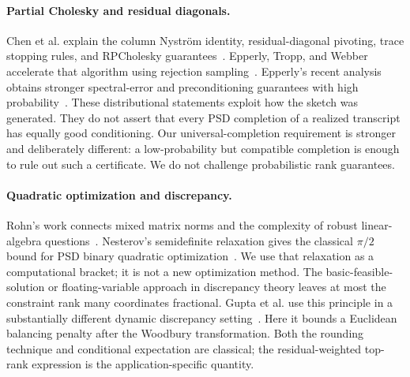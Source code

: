 \documentclass[11pt]{article}
\theoremstyle{definition}\newtheorem{definition}[theorem]{Definition}
\begin{document}
\paragraph{Partial Cholesky and residual diagonals.}
Chen et al. explain the column Nystr\"om identity, residual-diagonal pivoting, trace stopping rules, and RPCholesky guarantees~\cite{chen}. Epperly, Tropp, and Webber accelerate that algorithm using rejection sampling~\cite{accelerated}. Epperly's recent analysis obtains stronger spectral-error and preconditioning guarantees with high probability~\cite{epperly2026}. These distributional statements exploit how the sketch was generated. They do not assert that every PSD completion of a realized transcript has equally good conditioning. Our universal-completion requirement is stronger and deliberately different: a low-probability but compatible completion is enough to rule out such a certificate. We do not challenge probabilistic rank guarantees.

\paragraph{Quadratic optimization and discrepancy.}
Rohn's work connects mixed matrix norms and the complexity of robust linear-algebra questions~\cite{rohn}. Nesterov's semidefinite relaxation gives the classical $\pi/2$ bound for PSD binary quadratic optimization~\cite{nesterov}. We use that relaxation as a computational bracket; it is not a new optimization method. The basic-feasible-solution or floating-variable approach in discrepancy theory leaves at most the constraint rank many coordinates fractional. Gupta et al. use this principle in a substantially different dynamic discrepancy setting~\cite{discrepancy}. Here it bounds a Euclidean balancing penalty after the Woodbury transformation. Both the rounding technique and conditional expectation are classical; the residual-weighted top-rank expression is the application-specific quantity.
\end{document}
